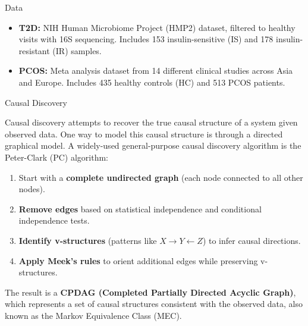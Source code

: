 \documentclass[final]{beamer}
\newlength{\colwidth}
\begin{document}
\begin{frame}[t]
\begin{columns}[t]
\begin{column}{\colwidth}
\begin{block}{Data}
    
    \begin{itemize}
      \item \textbf{T2D:} NIH Human Microbiome Project (HMP2) dataset, filtered to healthy visits with 16S sequencing. Includes 153 insulin-sensitive (IS) and 178 insulin-resistant (IR) samples.
      \item \textbf{PCOS:} Meta analysis dataset from 14 different clinical studies across Asia and Europe. Includes 435 healthy controls (HC) and 513 PCOS patients.
    \end{itemize}

  \end{block}
    
	\begin{alertblock}{Causal Discovery}
	  
	  	Causal discovery attempts to recover the true causal structure of a system given observed data. One way to model this causal structure is through a directed graphical model. A widely-used general-purpose causal discovery algorithm is the Peter-Clark (PC) algorithm:
		\begin{enumerate}
		    \item Start with a \textbf{complete undirected graph} (each node connected to all other nodes).
		    \item \textbf{Remove edges} based on statistical independence and conditional independence tests.
		    \item \textbf{Identify v-structures} (patterns like $X \to Y \leftarrow Z$) to infer causal directions.
		    \item \textbf{Apply Meek’s rules} to orient additional edges while preserving v-structures.
		\end{enumerate}

	The result is a \textbf{CPDAG (Completed Partially Directed Acyclic Graph)}, which represents a set of causal structures consistent with the observed data, also known as the Markov Equivalence Class (MEC). 

	  

\end{alertblock}
\end{column}
\end{columns}
\end{frame}
\end{document}
